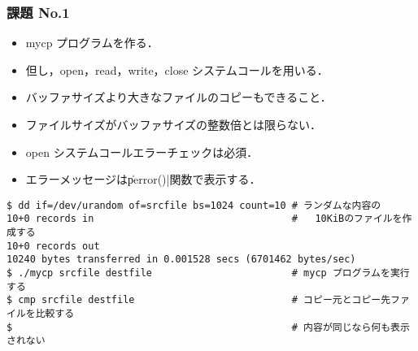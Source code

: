 \documentclass{beamer}                 %
\begin{document}
\begin{frame}[fragile]
\frametitle{課題 No.1}
\begin{itemize}
\item mycp プログラムを作る．
\item 但し，open，read，write，close システムコールを用いる．
\item バッファサイズより大きなファイルのコピーもできること．
\item ファイルサイズがバッファサイズの整数倍とは限らない．
\item open システムコールエラーチェックは必須．
\item エラーメッセージは\|perror()|関数で表示する．
\end{itemize}

\begin{lstlisting}[numbers=none]
$ dd if=/dev/urandom of=srcfile bs=1024 count=10 # ランダムな内容の
10+0 records in                                  #   10KiBのファイルを作成する
10+0 records out
10240 bytes transferred in 0.001528 secs (6701462 bytes/sec)
$ ./mycp srcfile destfile                        # mycp プログラムを実行する
$ cmp srcfile destfile                           # コピー元とコピー先ファイルを比較する
$                                                # 内容が同じなら何も表示されない
\end{lstlisting}
\end{frame}

\end{document}
